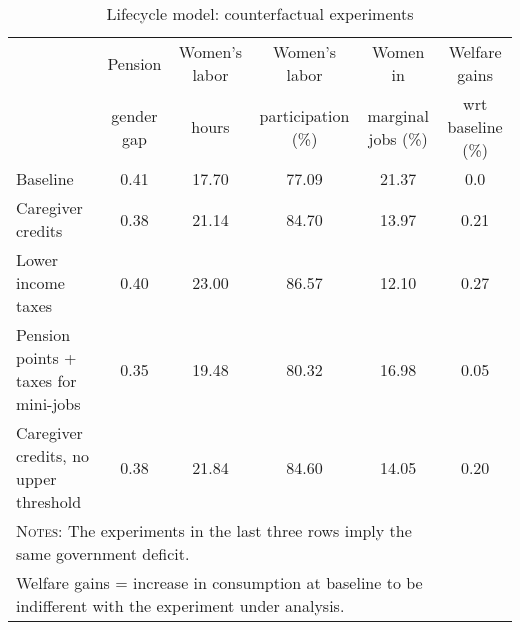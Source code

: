 \begin{table}[htbp]\caption{Lifecycle model: counterfactual experiments}\label{table:experiments}\centering\footnotesize\begin{tabular}{lccccc} \toprule & Pension & Women's labor & Women's labor & Women in &  Welfare gains  \\&gender gap &hours &  participation  (\%) & marginal jobs (\%)  & wrt baseline (\%)  \\\midrule    Baseline                                   &0.41&17.70&77.09&21.37& 0.0\\ Caregiver credits                          &0.38&21.14&84.70&13.97&0.21\\ Lower income taxes                         &0.40&23.00&86.57&12.10&0.27\\ Pension points + taxes for mini-jobs&0.35&19.48&80.32&16.98&0.05\\ Caregiver credits, no upper threshold      &0.38&21.84&84.60&14.05&0.20\\ \bottomrule\multicolumn{5}{l}{\textsc{Notes:} The experiments in the last three rows imply the same government deficit.}\\\multicolumn{5}{l}{Welfare gains = increase in consumption at baseline to be indifferent with the experiment under analysis. }\end{tabular}
      \end{table}
